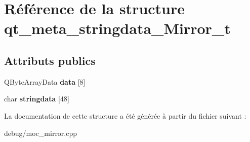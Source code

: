 \hypertarget{structqt__meta__stringdata___mirror__t}{}\section{Référence de la structure qt\+\_\+meta\+\_\+stringdata\+\_\+\+Mirror\+\_\+t}
\label{structqt__meta__stringdata___mirror__t}
\subsection*{Attributs publics}
\begin{DoxyCompactItemize}
\item 
\mbox{\label{structqt__meta__stringdata___mirror__t_afe4f7dec963772f444b3f7ffff3d5aaa}} 
Q\+Byte\+Array\+Data {\bfseries data} \mbox{[}8\mbox{]}
\item 
\mbox{\label{structqt__meta__stringdata___mirror__t_a97dddbfd0d0b473c375630b9c75671a2}} 
char {\bfseries stringdata} \mbox{[}48\mbox{]}
\end{DoxyCompactItemize}


La documentation de cette structure a été générée à partir du fichier suivant \+:\begin{DoxyCompactItemize}
\item 
debug/moc\+\_\+mirror.\+cpp\end{DoxyCompactItemize}
